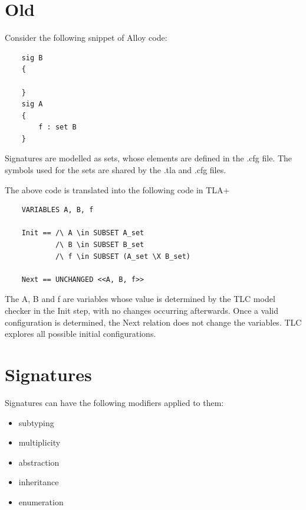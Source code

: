 \section{Old}




Consider the following snippet of Alloy code:

\begin{lstlisting}
	sig B
	{

	}
	sig A
	{
		f : set B
	}
\end{lstlisting}

Signatures are modelled as sets, whose elements are defined in the .cfg file. The symbols used for the sets are shared by the .tla and .cfg files. 

The above code is translated into the following code in TLA+

\begin{verbatim}
	VARIABLES A, B, f

	Init == /\ A \in SUBSET A_set
			/\ B \in SUBSET B_set
			/\ f \in SUBSET (A_set \X B_set)

	Next == UNCHANGED <<A, B, f>>
\end{verbatim}

The A, B and f are variables whose value is determined by the TLC model checker in the Init step, with no changes occurring afterwards. Once a valid configuration is determined, the Next relation does not change the variables. TLC explores all possible initial configurations.

\section{Signatures}

Signatures can have the following modifiers applied to them:

\begin{itemize}
	\item subtyping
	\item multiplicity
	\item abstraction
	\item inheritance
	\item enumeration
	
\end{itemize}


